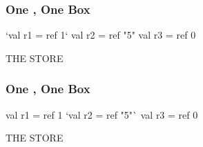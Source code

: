 \documentclass[aspectratio=169]{beamer}
\begin{document}
\begin{frame}[fragile]
  \frametitle{One , One Box}

  \begin{center}
    \begin{minipage}[t][2.5in][t]{0.55\textwidth}
      \vspace{\fill}
      \begin{codeblock}
        `val r1 = ref 1`
        val r2 = ref "5"
        val r3 = ref 0
      \end{codeblock}
      \vspace{\fill}
    \end{minipage}
    \hfill\vline\hfill
    \begin{minipage}[t][2.5in][t]{0.35\textwidth}
      \centering
      {\hspace{-20pt}\color{gray} \large THE STORE}

      \vspace{\fill}
      \vspace{\fill}
    \end{minipage}
  \end{center}
\end{frame}

\begin{frame}[fragile]
  \frametitle{One , One Box}

  \begin{center}
    \begin{minipage}[t][2.5in][t]{0.55\textwidth}
      \vspace{\fill}
      \begin{codeblock}
        val r1 = ref 1
        `val r2 = ref "5"`
        val r3 = ref 0
      \end{codeblock}
      \vspace{\fill}
    \end{minipage}
    \hfill\vline\hfill
    \begin{minipage}[t][2.5in][t]{0.35\textwidth}
      \centering
      {\hspace{-20pt}\color{gray} \large THE STORE}

      \vspace{\fill}
      \vspace{\fill}
    \end{minipage}
  \end{center}
\end{frame}
\end{document}
